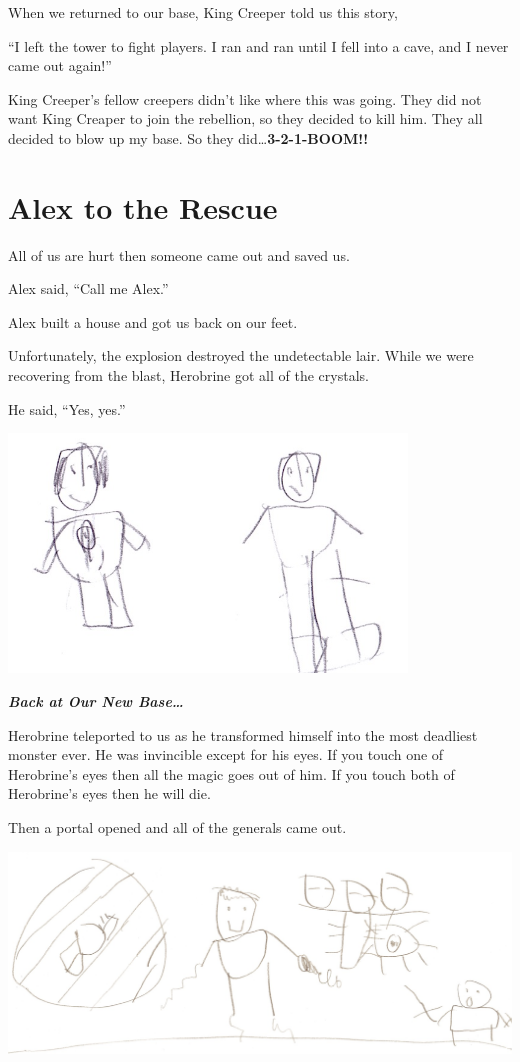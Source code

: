 \documentclass[oneside]{book}
\begin{document}
When we returned to our base, King Creeper told us this story,

``I left the tower to fight players. I ran and ran until I fell into a
cave, and I never came out again!''

King Creeper's fellow creepers didn't like where this was going. They
did not want King Creaper to join the rebellion, so they decided to kill
him. They all decided to blow up my base. So they
did\ldots{}\textbf{3-2-1-BOOM!!}

\chapter{Alex to the Rescue}\label{alex-to-the-rescue}

All of us are hurt then someone came out and saved us.

Alex said, ``Call me Alex.''

Alex built a house and got us back on our feet.

Unfortunately, the explosion destroyed the undetectable lair. While we
were recovering from the blast, Herobrine got all of the crystals.

He said, ``Yes, yes.''

\includegraphics[width=4.16667in]{img/alex-herobrine.jpg}

\textbf{\emph{Back at Our New Base\ldots{}}}

Herobrine teleported to us as he transformed himself into the most
deadliest monster ever. He was invincible except for his eyes. If you
touch one of Herobrine's eyes then all the magic goes out of him. If you
touch both of Herobrine's eyes then he will die.

Then a portal opened and all of the generals came out.

\includegraphics[width=6.25000in]{img/herobrine.jpg}
\end{document}
